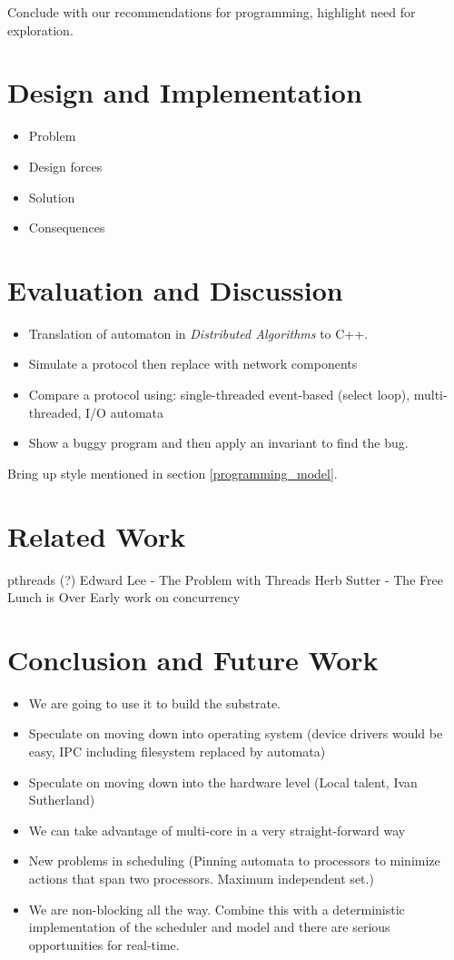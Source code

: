 \documentclass[letterpaper]{article}
\begin{document}
Conclude with our recommendations for programming, highlight need for exploration.

\section{Design and Implementation}

\begin{itemize}
  \item Problem
  \item Design forces
  \item Solution
  \item Consequences
\end{itemize}

\section{Evaluation and Discussion}

\begin{itemize}
\item Translation of automaton in \emph{Distributed Algorithms} to C++.
\item Simulate a protocol then replace with network components
\item Compare a protocol using: single-threaded event-based (select loop), multi-threaded, I/O automata
\item Show a buggy program and then apply an invariant to find the bug.
\end{itemize}

Bring up style mentioned in section \ref{programming_model}.

\section{Related Work}

pthreads (?)
Edward Lee - The Problem with Threads
Herb Sutter - The Free Lunch is Over
Early work on concurrency

\section{Conclusion and Future Work}

\begin{itemize}
  \item We are going to use it to build the substrate.
  \item Speculate on moving down into operating system (device drivers would be easy, IPC including filesystem replaced by automata)
  \item Speculate on moving down into the hardware level (Local talent, Ivan Sutherland)
  \item We can take advantage of multi-core in a very straight-forward way
  \item New problems in scheduling (Pinning automata to processors to minimize actions that span two processors.  Maximum independent set.)
  \item We are non-blocking all the way.  Combine this with a deterministic implementation of the scheduler and model and there are serious opportunities for real-time.
\end{itemize}
\end{document}
